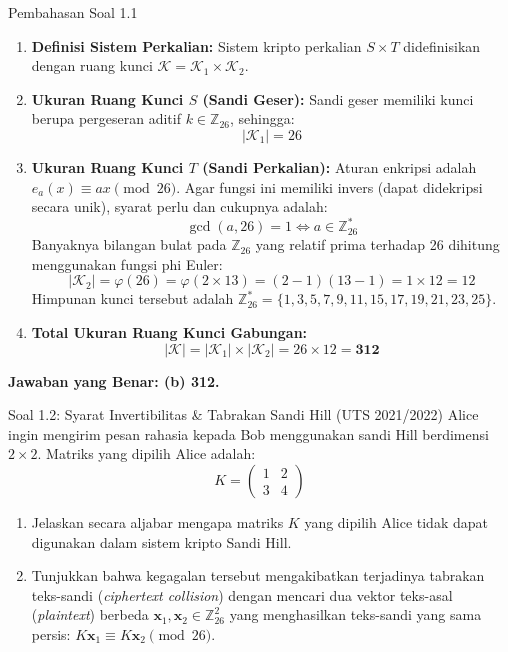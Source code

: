 \documentclass[11pt,a4paper]{article}
\begin{document}
\begin{solusibox}{Pembahasan Soal 1.1}
\begin{enumerate}[leftmargin=*]
    \item \textbf{Definisi Sistem Perkalian:} Sistem kripto perkalian $S \times T$ didefinisikan dengan ruang kunci $\mathcal{K} = \mathcal{K}_1 \times \mathcal{K}_2$.
    \item \textbf{Ukuran Ruang Kunci $S$ (Sandi Geser):} Sandi geser memiliki kunci berupa pergeseran aditif $k \in \mathbb{Z}_{26}$, sehingga:
    \[
    |\mathcal{K}_1| = 26
    \]
    \item \textbf{Ukuran Ruang Kunci $T$ (Sandi Perkalian):} Aturan enkripsi adalah $e_a(x) \equiv ax \pmod{26}$. Agar fungsi ini memiliki invers (dapat didekripsi secara unik), syarat perlu dan cukupnya adalah:
    \[
    \gcd(a, 26) = 1 \iff a \in \mathbb{Z}_{26}^*
    \]
    Banyaknya bilangan bulat pada $\mathbb{Z}_{26}$ yang relatif prima terhadap 26 dihitung menggunakan fungsi phi Euler:
    \[
    |\mathcal{K}_2| = \varphi(26) = \varphi(2 \times 13) = (2 - 1)(13 - 1) = 1 \times 12 = 12
    \]
    Himpunan kunci tersebut adalah $\mathbb{Z}_{26}^* = \{1, 3, 5, 7, 9, 11, 15, 17, 19, 21, 23, 25\}$.
    \item \textbf{Total Ukuran Ruang Kunci Gabungan:}
    \[
    |\mathcal{K}| = |\mathcal{K}_1| \times |\mathcal{K}_2| = 26 \times 12 = \mathbf{312}
    \]
\end{enumerate}
\textbf{Jawaban yang Benar: (b) 312.}
\end{solusibox}

\vspace{0.4cm}

\begin{soalbox}{Soal 1.2: Syarat Invertibilitas \& Tabrakan Sandi Hill (UTS 2021/2022)}
Alice ingin mengirim pesan rahasia kepada Bob menggunakan sandi Hill berdimensi $2 \times 2$. Matriks yang dipilih Alice adalah:
\[
K = \begin{pmatrix} 1 & 2 \\ 3 & 4 \end{pmatrix}
\]
\begin{enumerate}[label=(\alph*)]
    \item Jelaskan secara aljabar mengapa matriks $K$ yang dipilih Alice tidak dapat digunakan dalam sistem kripto Sandi Hill.
    \item Tunjukkan bahwa kegagalan tersebut mengakibatkan terjadinya tabrakan teks-sandi (\textit{ciphertext collision}) dengan mencari dua vektor teks-asal (\textit{plaintext}) berbeda $\mathbf{x}_1, \mathbf{x}_2 \in \mathbb{Z}_{26}^2$ yang menghasilkan teks-sandi yang sama persis: $K\mathbf{x}_1 \equiv K\mathbf{x}_2 \pmod{26}$.
\end{enumerate}
\end{soalbox}
\end{document}
